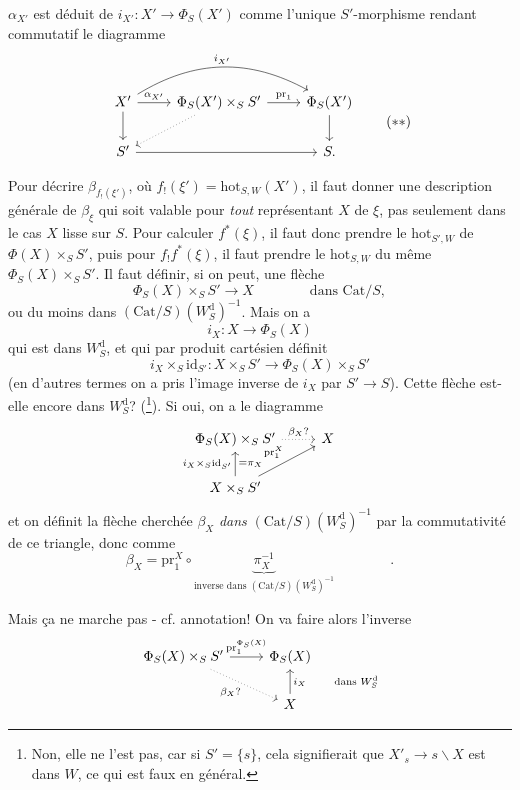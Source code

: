 \documentclass[11pt]{article}
\newcommand{\printedpage}[1]{\marginpar{\footnotesize p.~#1}}
\newcommand{\msp}[1]{\marginpar{\footnotesize [#1]}}
\newcommand{\hot}{\mathrm{hot}}
\newcommand{\Cat}{\mathrm{Cat}}
\newcommand{\id}{\mathrm{id}}
\newcommand{\pr}{\mathrm{pr}}
\newcommand{\Wd}{W^{\mathrm{d}}}
\begin{document}
$\alpha_{X'}$ est déduit de $i_{X'} : X'\longrightarrow\Phi_S(X')$ comme l'unique $S'$-morphisme rendant commutatif le diagramme
\[
\begin{tikzcd}
X' \arrow[r, "{\alpha_{X'}}"] \arrow[d] \arrow[rr, bend left, "{i_{X'}}"] & \Phi_S(X')\times_S S' \arrow[r, "\pr_1"] \arrow[dl, dotted] & \Phi_S(X') \arrow[d] \\ %
S' \arrow[rr] & & S.
\end{tikzcd}
\tag*{$(**)$}
\]

Pour décrire $\beta_{f_!(\xi')}$, où $f_!(\xi') = \hot_{S,W}(X')$, il faut donner une description générale de $\beta_\xi$ qui soit valable pour \textit{tout} représentant $X$ de $\xi$, pas seulement dans le cas $X$ lisse sur $S$. Pour calculer $f^*(\xi)$, il faut donc prendre le $\hot_{S',W}$ de $\Phi(X)\times_S S'$, puis pour $f_!f^*(\xi)$, il \msp{page 142}faut prendre le $\hot_{S,W}$ du même $\Phi_S(X)\times_S S'$. Il faut définir, si on peut, une flèche
\[
\Phi_S(X)\times_S S' \longrightarrow X \qquad\qquad \text{dans } \Cat/S,
\]
ou du moins dans $(\Cat/S)(\Wd_S)^{-1}$. Mais on a
\[
i_X : X \longrightarrow \Phi_S(X)
\]
qui est dans $\Wd_S$, et qui par produit cartésien définit
\[
i_X\times_S\id_{S'} : X\times_S S' \longrightarrow \Phi_S(X)\times_S S'
\]
(en d'autres termes on a pris l'image inverse de $i_X$ par $S'\longrightarrow S$). Cette flèche est-elle encore dans $\Wd_S$? (\footnote[69]{Non, elle ne l'est pas, car si $S'=\{s\}$, cela signifierait que $X'_s\longrightarrow s\backslash X$ est dans $W$, ce qui est faux en général.}). Si oui, on a le diagramme
\printedpage{87}
\[
\begin{tikzcd}
\Phi_S(X)\times_S S' \arrow[r, dotted, "\beta_X ?"] & X \\
X\times_S S' \arrow[u, "{i_X\times_S\id_{S'}}", "{=\pi_X}"'] \arrow[ur, "\pr_1^X"] &
\end{tikzcd}
\]
et on définit la flèche cherchée $\beta_X$ \textit{dans} $(\Cat/S)(\Wd_S)^{-1}$ par la commutativité de ce triangle, donc comme
\[
\beta_X = \pr_1^X\circ\underbrace{\pi_X^{-1}}_{\text{inverse dans }(\Cat/S)(\Wd_S)^{-1}} \qquad\qquad .
\]

\leavevmode\msp{page 143}Mais ça ne marche pas - cf. annotation! On va faire alors l'inverse
\[
\begin{tikzcd}
\Phi_S(X)\times_S S' \arrow[r, "\pr_1^{\Phi_S(X)}"] \arrow[dr, dotted, "\beta_X ?"'] & \Phi_S(X) \\
 & X \arrow[u, "{i_X \qquad \text{dans } \Wd_S}"']
\end{tikzcd}
\]
\end{document}
